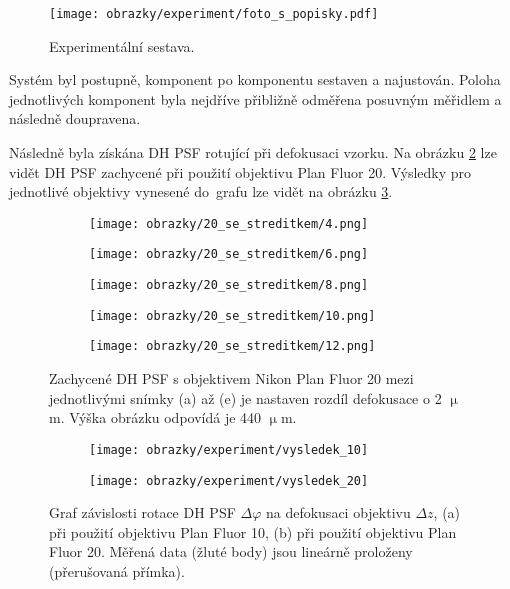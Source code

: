 \documentclass[12pt, a4paper, twoside]{article}
\begin{document}
\begin{figure}[t]
  \centering
  \texttt{[image: obrazky/experiment/foto\_s\_popisky.pdf]}
  \caption{Experimentální sestava.}
  \label{fig:exp_setup}
\end{figure}

Systém byl postupně, komponent po komponentu sestaven a najustován. Poloha jednotlivých komponent byla nejdříve přibližně odměřena posuvným měřidlem a následně doupravena.

Následně byla získána DH PSF rotující při defokusaci vzorku. Na obrázku \ref{fig:vysl_20} lze vidět DH PSF zachycené při použití objektivu Plan Fluor 20. Výsledky pro jednotlivé objektivy vynesené do~grafu lze vidět na obrázku \ref{fig:rotace_grafy}.

\begin{figure}[h!] \centering
  \begin{subfigure}{0.30\textwidth}
    \texttt{[image: obrazky/20\_se\_streditkem/4.png]}
    \caption{}
  \end{subfigure}
  \begin{subfigure}{0.30\textwidth}
    \texttt{[image: obrazky/20\_se\_streditkem/6.png]}
    \caption{}
  \end{subfigure}
  \begin{subfigure}{0.30\textwidth}
    \texttt{[image: obrazky/20\_se\_streditkem/8.png]}
    \caption{}
  \end{subfigure}

  \begin{subfigure}{0.30\textwidth}
    \texttt{[image: obrazky/20\_se\_streditkem/10.png]}
    \caption{}
  \end{subfigure}
  \begin{subfigure}{0.30\textwidth}
    \texttt{[image: obrazky/20\_se\_streditkem/12.png]}
    \caption{}
  \end{subfigure}
  \caption[Víry získané s objektivem Nikon plan 20.]{Zachycené DH PSF s objektivem Nikon Plan Fluor 20 mezi jednotlivými snímky (a) až (e) je nastaven rozdíl defokusace o 2 $\upmu$m. Výška obrázku odpovídá je 440 $\upmu$m.}
  \label{fig:vysl_20}
\end{figure}

\begin{figure}[h!] \centering
  \begin{subfigure}{0.6\textwidth}
    \texttt{[image: obrazky/experiment/vysledek\_10]}
    \caption{}
  \end{subfigure}
  \begin{subfigure}{0.6\textwidth}
    \texttt{[image: obrazky/experiment/vysledek\_20]}
    \caption{}
  \end{subfigure}
  \caption{Graf závislosti rotace DH PSF $\Delta\varphi$ na defokusaci objektivu $\Delta z$, (a) při použití objektivu Plan Fluor 10, (b) při použití objektivu Plan Fluor 20. Měřená data (žluté body) jsou lineárně proloženy (přerušovaná přímka). }
  \label{fig:rotace_grafy}
\end{figure}
\end{document}
